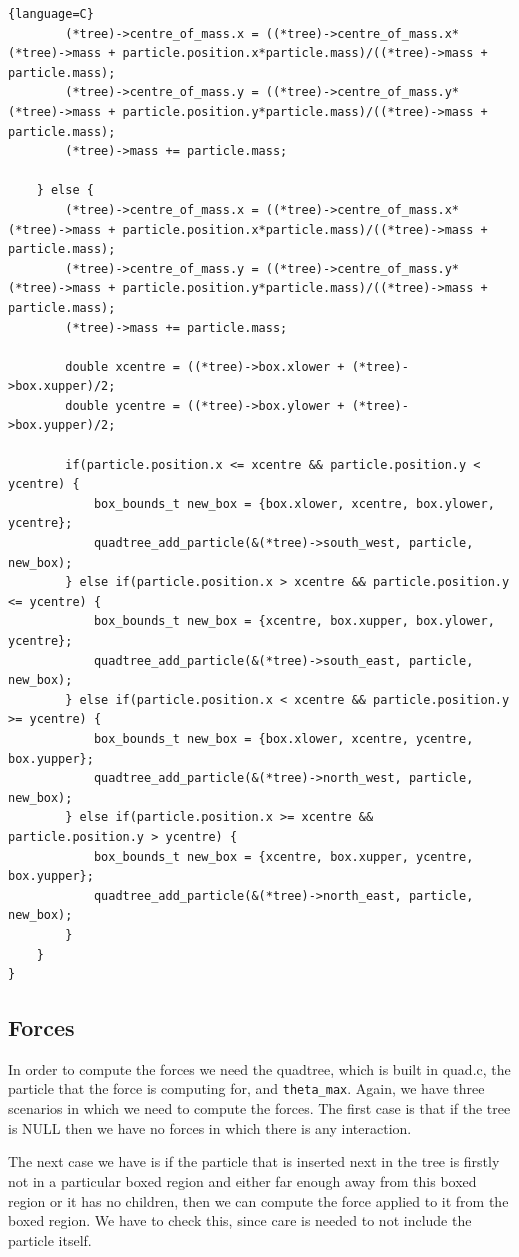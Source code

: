 \begin{lstlisting}{language=C}
        (*tree)->centre_of_mass.x = ((*tree)->centre_of_mass.x*(*tree)->mass + particle.position.x*particle.mass)/((*tree)->mass + particle.mass);
        (*tree)->centre_of_mass.y = ((*tree)->centre_of_mass.y*(*tree)->mass + particle.position.y*particle.mass)/((*tree)->mass + particle.mass);
        (*tree)->mass += particle.mass;

    } else {
        (*tree)->centre_of_mass.x = ((*tree)->centre_of_mass.x*(*tree)->mass + particle.position.x*particle.mass)/((*tree)->mass + particle.mass);
        (*tree)->centre_of_mass.y = ((*tree)->centre_of_mass.y*(*tree)->mass + particle.position.y*particle.mass)/((*tree)->mass + particle.mass);
        (*tree)->mass += particle.mass;

        double xcentre = ((*tree)->box.xlower + (*tree)->box.xupper)/2;
        double ycentre = ((*tree)->box.ylower + (*tree)->box.yupper)/2;

        if(particle.position.x <= xcentre && particle.position.y < ycentre) {
            box_bounds_t new_box = {box.xlower, xcentre, box.ylower, ycentre};
            quadtree_add_particle(&(*tree)->south_west, particle, new_box);
        } else if(particle.position.x > xcentre && particle.position.y <= ycentre) {
            box_bounds_t new_box = {xcentre, box.xupper, box.ylower, ycentre};
            quadtree_add_particle(&(*tree)->south_east, particle, new_box);
        } else if(particle.position.x < xcentre && particle.position.y >= ycentre) {
            box_bounds_t new_box = {box.xlower, xcentre, ycentre, box.yupper};
            quadtree_add_particle(&(*tree)->north_west, particle, new_box);
        } else if(particle.position.x >= xcentre && particle.position.y > ycentre) {
            box_bounds_t new_box = {xcentre, box.xupper, ycentre, box.yupper};
            quadtree_add_particle(&(*tree)->north_east, particle, new_box);
        }
    }
}
\end{lstlisting}
\subsection{Forces}
In order to compute the forces we need the quadtree, which is built in quad.c, the particle that the force is computing for, and \verb|theta_max|. Again, we have three scenarios in which we need to compute the forces. The first case is that if the tree is NULL then we have no forces in which there is any interaction.

The next case we have is if the particle that is inserted next in the tree is firstly not in a particular boxed region and either far enough away from this boxed region or it has no children, then we can compute the force applied to it from the boxed region. We have to check this, since care is needed to not include the particle itself.

